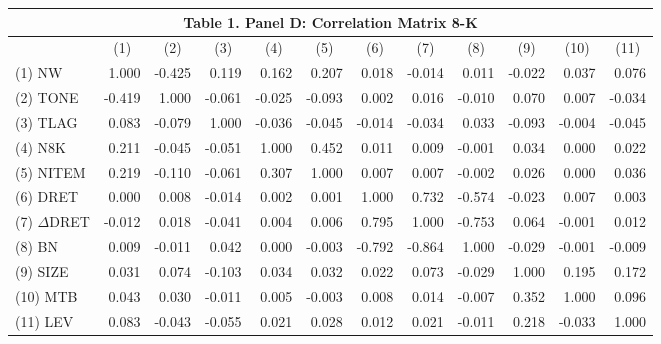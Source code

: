 \begin{table}[htbp] \label{T1PD}
  \centering
    \begin{tabular}{lrrrrrrrrrrr}
    \multicolumn{12}{c}{\textbf{Table 1. Panel D: Correlation Matrix 8-K}} \\
    \midrule
      & \multicolumn{1}{c}{(1)} & \multicolumn{1}{c}{(2)} & \multicolumn{1}{c}{(3)} & \multicolumn{1}{c}{(4)} & \multicolumn{1}{c}{(5)} & \multicolumn{1}{c}{(6)} & \multicolumn{1}{c}{(7)} & \multicolumn{1}{c}{(8)} & \multicolumn{1}{c}{(9)} & \multicolumn{1}{c}{(10)} & \multicolumn{1}{c}{(11)} \\
    \midrule
    (1) NW & 1.000 & -0.425 & 0.119 & 0.162 & 0.207 & 0.018 & -0.014 & 0.011 & -0.022 & 0.037 & 0.076 \\
    (2) TONE & -0.419 & 1.000 & -0.061 & -0.025 & -0.093 & 0.002 & 0.016 & -0.010 & 0.070 & 0.007 & -0.034 \\
    (3) TLAG & 0.083 & -0.079 & 1.000 & -0.036 & -0.045 & -0.014 & -0.034 & 0.033 & -0.093 & -0.004 & -0.045 \\
    (4) N8K & 0.211 & -0.045 & -0.051 & 1.000 & 0.452 & 0.011 & 0.009 & -0.001 & 0.034 & 0.000 & 0.022 \\
    (5) NITEM & 0.219 & -0.110 & -0.061 & 0.307 & 1.000 & 0.007 & 0.007 & -0.002 & 0.026 & 0.000 & 0.036 \\
    (6) DRET & 0.000 & 0.008 & -0.014 & 0.002 & 0.001 & 1.000 & 0.732 & -0.574 & -0.023 & 0.007 & 0.003 \\
    (7) $\Delta$DRET & -0.012 & 0.018 & -0.041 & 0.004 & 0.006 & 0.795 & 1.000 & -0.753 & 0.064 & -0.001 & 0.012 \\
    (8) BN & 0.009 & -0.011 & 0.042 & 0.000 & -0.003 & -0.792 & -0.864 & 1.000 & -0.029 & -0.001 & -0.009 \\
    (9) SIZE & 0.031 & 0.074 & -0.103 & 0.034 & 0.032 & 0.022 & 0.073 & -0.029 & 1.000 & 0.195 & 0.172 \\
    (10) MTB & 0.043 & 0.030 & -0.011 & 0.005 & -0.003 & 0.008 & 0.014 & -0.007 & 0.352 & 1.000 & 0.096 \\
    (11) LEV & 0.083 & -0.043 & -0.055 & 0.021 & 0.028 & 0.012 & 0.021 & -0.011 & 0.218 & -0.033 & 1.000 \\
    \bottomrule
    \end{tabular}%
  \label{tab:addlabel}%
\end{table}%
